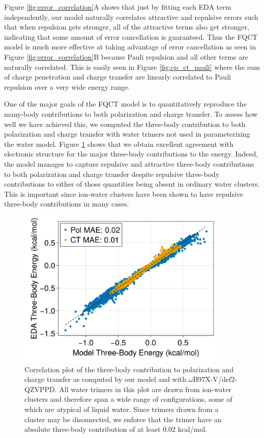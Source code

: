 \documentclass[journal=jctcce,manuscript=article]{achemso}
\begin{document}
Figure \ref{fig:error_correlation}A shows that just by fitting each EDA term independently, our model naturally correlates attractive and repulsive errors such that when repulsion gets stronger, all of the attractive terms also get stronger, indicating that some amount of error cancellation is guaranteed. Thus the FQCT model is much more effective at taking advantage of error cancellation as seen in Figure \ref{fig:error_correlation}B because Pauli repulsion and all other terms are naturally correlated. This is easily seen in Figure \ref{fig:cp_ct_pauli} where the sum of charge penetration and charge transfer are linearly correlated to Pauli repulsion over a very wide energy range.

One of the major goals of the FQCT model is to quantitatively reproduce the many-body contributions to both polarization and charge transfer. To assess how well we have achieved this, we computed the three-body contribution to both polarization and charge transfer with water trimers not used in parameterizing the water model.  Figure \ref{fig:pol_ct_water} shows that we obtain excellent agreement with electronic structure for the major three-body contributions to the energy. Indeed, the model manages to capture repulsive and attractive three-body contributions to both polarization and charge transfer despite repulsive three-body contributions to either of those quantities being absent in ordinary water clusters.\cite{heindel2020many} This is important since ion-water clusters have been shown to have repulsive three-body contributions in many cases.\cite{heindel2021many,herman2021many}
\begin{figure}[h]
  \includegraphics*[width=0.9\textwidth]{figures/three_body_pol_and_ct_water.png}
  \caption{Correlation plot of the three-body contribution to polarization and
  charge transfer as computed by our model and with $\omega$B97X-V/def2-QZVPPD.
  All water trimers in this plot are drawn from ion-water clusters and therefore
  span a wide range of configurations, some of which are atypical of liquid water.
  Since trimers drawn from a cluster may be disonnected, we enforce that the trimer
  have an absolute three-body contribution of at least 0.02 kcal/mol.
}
  \label{fig:pol_ct_water}
\end{figure}
\end{document}
